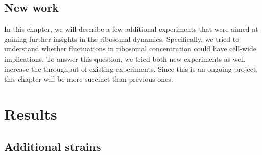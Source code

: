 \subsection{New work}

In this chapter, we will describe a few additional experiments that were aimed at gaining further insights in the ribosomal dynamics.
Specifically, we tried to understand whether fluctuations in ribosomal concentration could have cell-wide implications.
%
To answer this question, we tried both new experiments as well increase the throughput of existing experiments.
%
Since this is an ongoing project, this chapter will be more succinct than previous ones.

\section{Results}

\subsection{Additional strains}

